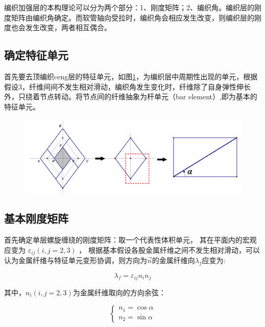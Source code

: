 编织加强层的本构理论可以分为两个部分：1、刚度矩阵；2、编织角。编织层的刚度矩阵由编织角确定。而软管轴向受拉时，编织角会相应发生改变，则编织层的刚度也会发生改变，两者相互偶合。


\subsection{确定特征单元}
首先要去顶编织ceng层的特征单元，如图\ref{fig:unit}，为编织层中周期性出现的单元，根据假设3，纤维间间不发生相对滑动，编织角发生变化时，纤维除了自身弹性伸长外，只绕着节点转动。将节点间的纤维抽象为杆单元（bar element）,即为基本的特征单元。
\begin{figure}[!htp]
\centering
\includegraphics[width=0.9\linewidth]{figure/chap3/unit}
\label{fig:unit}
\end{figure}




\subsection{基本刚度矩阵}
首先确定单层螺旋缠绕的刚度矩阵：取一个代表性体积单元，
其在平面内的宏观应变为
$ {\varepsilon _{ij}}\left( {i,j = 2,3} \right)$ ，
根据基本假设各股金属纤维之间不发生相对滑动，可以认为金属纤维与特征单元变形协调，则方向为$  \vec{n} $的金属纤维向$ \lambda_f $应变为\cite{gaosiyang2009}:







\begin{equation}
{\lambda _f} = {\varepsilon _{ij}}{n_i}{n_j}
\end{equation}

其中，$ n_i\left( {i,j = 2,3} \right) $为金属纤维取向的方向余弦：

\begin{equation}
\label{eq:fiber-strain}
\left\{ {\begin{array}{*{20}{c}}
	{{n_1} = \cos \alpha }\\
	{{n_2} = \sin \alpha }
	\end{array}} \right.
\end{equation}

